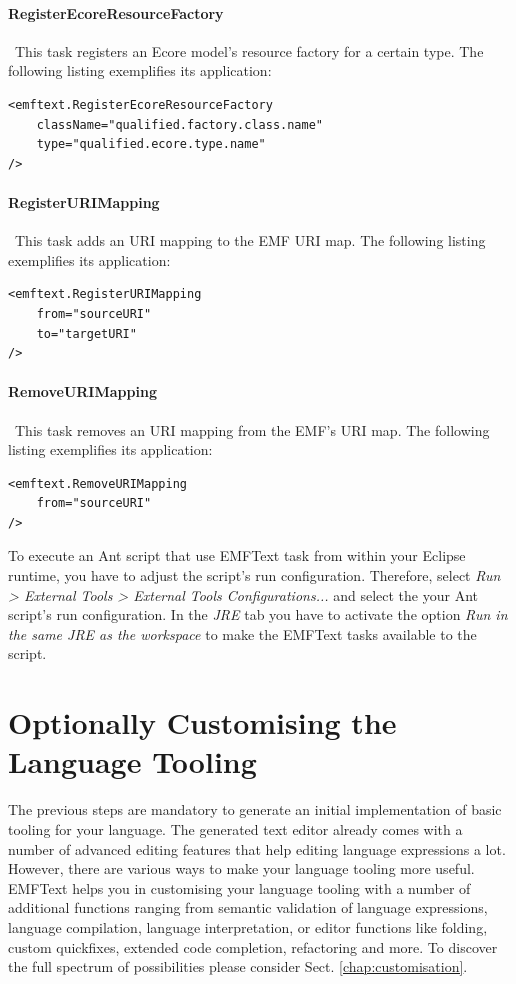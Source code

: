 	\paragraph*{RegisterEcoreResourceFactory}~This task registers an Ecore
	model's resource factory for a certain type. 
	The following listing exemplifies its application:
\begin{lstlisting}
<emftext.RegisterEcoreResourceFactory
	className="qualified.factory.class.name"
	type="qualified.ecore.type.name"
/>
\end{lstlisting}
	\paragraph*{RegisterURIMapping}~This task adds an URI mapping to the EMF URI
	map. 
	The following listing exemplifies its application:
\begin{lstlisting}
<emftext.RegisterURIMapping
	from="sourceURI"
	to="targetURI"
/>
\end{lstlisting}

\paragraph*{RemoveURIMapping}~This task removes an URI mapping from the EMF's
URI map. 
The following listing exemplifies its application: 
\begin{lstlisting}
<emftext.RemoveURIMapping
	from="sourceURI"
/>
\end{lstlisting}
	
	
	To execute an Ant script that use EMFText task from within your Eclipse
	runtime, you have to adjust the script's run configuration. Therefore, select 
	\emph{Run > External Tools > External Tools Configurations...} and select the
	your Ant script's run configuration. In the \emph{JRE} tab you have to
	activate the option \emph{Run in the same JRE as the workspace} to make the
	EMFText tasks available to the script.
	
\section{Optionally Customising the Language Tooling}

The previous steps are mandatory to generate an initial implementation of
basic tooling for your language. The generated text editor already
comes with a number of advanced editing features that help editing language
expressions a lot. However, there are various ways to make your language tooling
more useful. EMFText helps you in customising your language tooling with a
number of additional functions ranging from semantic validation of language
expressions, language compilation, language interpretation, or editor functions
like folding, custom quickfixes, extended code completion, refactoring and more.
To discover the full spectrum of possibilities please consider Sect.
\ref{chap:customisation}.
